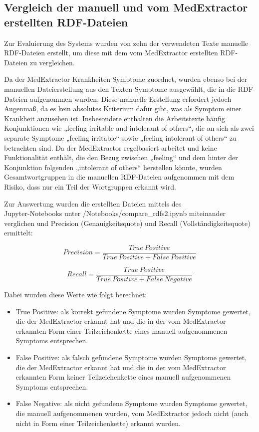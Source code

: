 

\subsection{Vergleich der manuell und vom MedExtractor erstellten RDF-Dateien}
\label{subsec:RDF-Vergleich} 

Zur Evaluierung des Systems wurden von zehn der verwendeten Texte manuelle RDF-Dateien erstellt, um diese mit dem vom MedExtractor erstellten RDF-Dateien zu vergleichen. 

Da der MedExtractor Krankheiten Symptome zuordnet, wurden ebenso bei der manuellen Dateierstellung aus den Texten Symptome ausgewählt, die in die RDF-Dateien aufgenommen wurden. Diese manuelle Erstellung erfordert jedoch Augenmaß, da es kein absolutes Kriterium dafür gibt, was als Symptom einer Krankheit anzusehen ist. Insbesondere enthalten die Arbeitstexte häufig Konjunktionen wie „feeling irritable and intolerant of others“, die an sich als zwei separate Symptome „feeling irritable“ sowie „feeling intolerant of others“ zu betrachten sind. Da der MedExtractor regelbasiert arbeitet und keine Funktionalität enthält, die den Bezug zwischen „feeling“ und dem hinter der Konjunktion folgenden „intolerant of others“ herstellen könnte, wurden Gesamtwortgruppen in die manuellen RDF-Dateien aufgenommen mit dem Risiko, dass nur ein Teil der Wortgruppen erkannt wird.

Zur Auswertung wurden die erstellten Dateien mittels des \\
Jupyter-Notebooks unter /Notebooks/compare\_rdfs2.ipynb miteinander verglichen und Precision (Genauigkeitsquote) und Recall (Vollständigkeitsquote) ermittelt:

\[ Precision = \frac{True\ Positive}{True\ Positive + False\ Positive} \]

\[ Recall = \frac{True\ Positive}{True\ Positive + False\ Negative} \]

Dabei wurden diese Werte wie folgt berechnet:
\begin{itemize}
\item True Positive: als korrekt gefundene Symptome wurden Symptome gewertet, die der MedExtractor erkannt hat und die in der vom MedExtractor erkannten Form einer Teilzeichenkette eines manuell aufgenommenen Symptoms entsprechen. 
\item False Positive: als falsch gefundene Symptome wurden Symptome gewertet, die der MedExtractor erkannt hat und die in der vom MedExtractor erkannten Form keiner Teilzeichenkette eines manuell aufgenommenen Symptoms entsprechen.
\item False Negative: als nicht gefundene Symptome wurden Symptome gewertet, die manuell aufgenommenen wurden, vom MedExtractor jedoch nicht (auch nicht in Form einer Teilzeichenkette) erkannt wurden.
\end{itemize}


